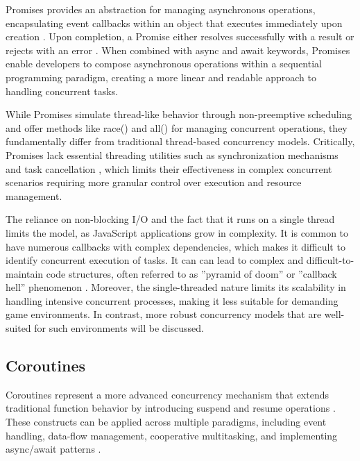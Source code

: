 \documentclass[]{interim}
\begin{document}
Promises provides an abstraction for managing asynchronous operations,
encapsulating event callbacks within an object that executes
immediately upon creation \cite{zhao_concurrency_2021}.
Upon completion, a Promise either
resolves successfully with a result or rejects with an error
\cite{zhao_concurrency_2021}. When combined with async and await
keywords, Promises enable
developers to compose asynchronous operations within a
sequential programming paradigm, creating a more linear and
readable approach to handling concurrent tasks.

While Promises simulate thread-like behavior through non-preemptive scheduling
and offer methods like race() and all() for managing concurrent operations,
\cite{noauthor_event_2024} they fundamentally differ from traditional thread-based
concurrency models.
Critically, Promises lack essential threading utilities such as synchronization
mechanisms and task cancellation \cite{zhao_concurrency_2021}, which limits their effectiveness in
complex concurrent scenarios requiring more granular control over execution
and resource management.

The reliance on non-blocking I/O and the fact that it runs on a single thread
limits the model, as JavaScript applications grow in complexity. It
is common to have numerous callbacks with complex dependencies,
which makes it difficult to identify concurrent
execution of tasks.
It can can lead to complex and difficult-to-maintain code structures, often
referred to as ”pyramid of doom” or ”callback hell” phenomenon \cite{belson_survey_2019, noauthor_callback_nodate}.
Moreover, the single-threaded nature limits its scalability in handling
intensive concurrent processes, making it less suitable for demanding game environments.
In contrast, more robust concurrency models that are well-suited for
such environments will be discussed.

\subsection{Coroutines}

Coroutines represent a more advanced concurrency mechanism that extends
traditional function behavior by introducing suspend and resume operations \cite{belson_survey_2019}.
These  constructs can be applied across multiple paradigms, including event
handling, data-flow management, cooperative multitasking, and
implementing async/await patterns \cite{belson_survey_2019}.
\end{document}
